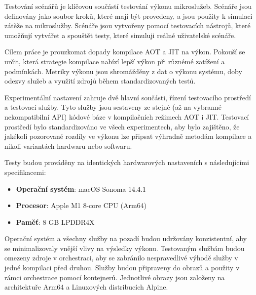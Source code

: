 


Testování scénářů je klíčovou součástí testování výkonu mikroslužeb. Scénáře jsou definovány jako soubor kroků, které mají být provedeny, a jsou použity k simulaci zátěže na mikroslužby. Scénáře jsou vytvořeny pomocí testovacích nástrojů, které umožňují vytvářet a spouštět testy, které simuluji reálné uživatelské scénáře.


Cílem práce je prouzkomat dopady kompilace AOT a JIT na výkon. Pokouší se určit, která strategie kompilace nabízí lepší výkon při různémé zatížení a podmínkách. Metriky výkonu jsou shromážděny z dat o výkonu systému, doby odezvy služeb a využití zdrojů během standardizovaných testů.

Experimentální nastavení zahruje dvě hlavní součásti, řízení testovacího prostředí a testovací služby. Tyto služby jsou sestaveny ze stejné (až na vybranné nekompatibilní API) kódové báze v kompilačních režimech AOT i JIT. Testovací prostředí bylo standardizováno ve všech experimentech, aby bylo zajištěno, že jakékoli pozorované rozdíly ve výkonu lze připsat výhradně metodám kompilace a nikoli variantách hardwaru nebo softwaru.

Testy budou prováděny na identických hardwarových nastaveních s následujícími specifikacemi:

\begin{itemize}
    \item \textbf{Operační systém}: macOS Sonoma 14.4.1
    \item \textbf{Procesor}: Apple M1 8-core CPU (Arm64)
    \item \textbf{Paměť}: 8 GB LPDDR4X
\end{itemize}

Operační systém a všechny služby na pozadí budou udržovány konzistentní, aby se minimalizovaly vnější vlivy na výsledky výkonu. Testovaným službám budou omezeny zdroje v orchestraci, aby se zabránilo nespravedlivé výhodě služby v jedné kompilaci před druhou. Služby budou připraveny do obrazů a použity v rámci orchestrace pomocí kontejnerů. Jednotlivé obrazy jsou založeny na architektuře Arm64 a Linuxových distribucích Alpine.

